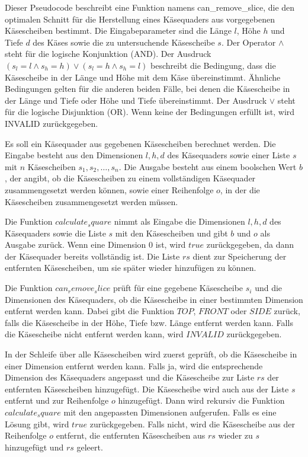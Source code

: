 \documentclass[a4paper,10pt,ngerman]{scrartcl}
\begin{document}
    Dieser Pseudocode beschreibt eine Funktion namens can\_remove\_slice, die den optimalen Schnitt für die Herstellung eines Käsequaders aus vorgegebenen Käsescheiben bestimmt.
    Die Eingabeparameter sind die Länge $l$, Höhe $h$ und Tiefe $d$ des Käses sowie die zu untersuchende Käsescheibe $s$.
    Der Operator $\land$ steht für die logische Konjunktion (AND).
    Der Ausdruck $(s_l = l \land s_h = h) \lor (s_l = h \land s_h = l)$ beschreibt die Bedingung,
    dass die Käsescheibe in der Länge und Höhe mit dem Käse übereinstimmt.
    Ähnliche Bedingungen gelten für die anderen beiden Fälle, bei denen die Käsescheibe in der Länge und Tiefe oder Höhe und Tiefe übereinstimmt.
    Der Ausdruck $\lor$ steht für die logische Disjunktion (OR).
    Wenn keine der Bedingungen erfüllt ist, wird INVALID zurückgegeben.

    Es soll ein Käsequader aus gegebenen Käsescheiben berechnet werden.
    Die Eingabe besteht aus den Dimensionen $l, h, d$ des Käsequaders sowie einer Liste $s$ mit $n$ Käsescheiben $s_1, s_2, \dots, s_n$.
    Die Ausgabe besteht aus einem boolschen Wert $b$, der angibt, ob die Käsescheiben zu einem vollständigen Käsequader zusammengesetzt werden können,
    sowie einer Reihenfolge $o$, in der die Käsescheiben zusammengesetzt werden müssen.

    Die Funktion $calculate_square$ nimmt als Eingabe die Dimensionen $l, h, d$ des Käsequaders sowie die Liste $s$ mit den Käsescheiben und gibt $b$ und $o$ als Ausgabe zurück.
    Wenn eine Dimension $0$ ist, wird $true$ zurückgegeben, da dann der Käsequader bereits vollständig ist.
    Die Liste $rs$ dient zur Speicherung der entfernten Käsescheiben, um sie später wieder hinzufügen zu können.

    Die Funktion $can_remove_slice$ prüft für eine gegebene Käsescheibe $s_i$ und die Dimensionen des Käsequaders, ob die Käsescheibe in einer bestimmten Dimension entfernt werden kann.
    Dabei gibt die Funktion $TOP$, $FRONT$ oder $SIDE$ zurück, falls die Käsescheibe in der Höhe,
    Tiefe bzw.
    Länge entfernt werden kann.
    Falls die Käsescheibe nicht entfernt werden kann, wird $INVALID$ zurückgegeben.

    In der Schleife über alle Käsescheiben wird zuerst geprüft, ob die Käsescheibe in einer Dimension entfernt werden kann.
    Falls ja, wird die entsprechende Dimension des Käsequaders angepasst und die Käsescheibe zur Liste $rs$ der entfernten Käsescheiben hinzugefügt.
    Die Käsescheibe wird auch aus der Liste $s$ entfernt und zur Reihenfolge $o$ hinzugefügt.
    Dann wird rekursiv die Funktion $calculate_square$ mit den angepassten Dimensionen aufgerufen.
    Falls es eine Lösung gibt, wird $true$ zurückgegeben.
    Falls nicht, wird die Käsescheibe aus der Reihenfolge $o$ entfernt, die entfernten Käsescheiben aus $rs$ wieder zu $s$ hinzugefügt und $rs$ geleert.
\end{document}
